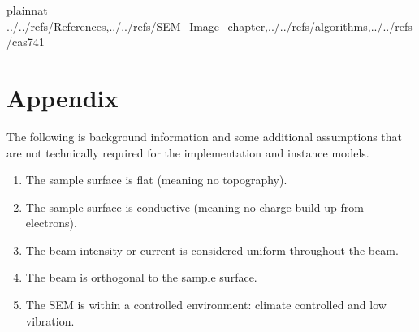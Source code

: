 \documentclass[12pt]{article}
\begin{document}
\newpage

\clearpage

 {plainnat}
 {../../refs/References,../../refs/SEM_Image_chapter,../../refs/algorithms,../../refs/cas741}


\newpage

\clearpage

\section{Appendix}

The following is background information and some additional assumptions that are not
technically required for the implementation and instance models.

\begin{enumerate}
  \item \label{A_sampleTopo} The sample surface is flat (meaning no topography).

  \item \label{A_sampleConductive} The sample surface is conductive (meaning no charge build up from electrons).

  \item \label{A_beam1} The beam intensity or current is considered uniform throughout the beam.

  \item \label{A_beam2} The beam is orthogonal to the sample surface.

  \item \label{A_environment} The SEM is within a controlled environment: climate controlled and low vibration.
\end{enumerate}
\end{document}
